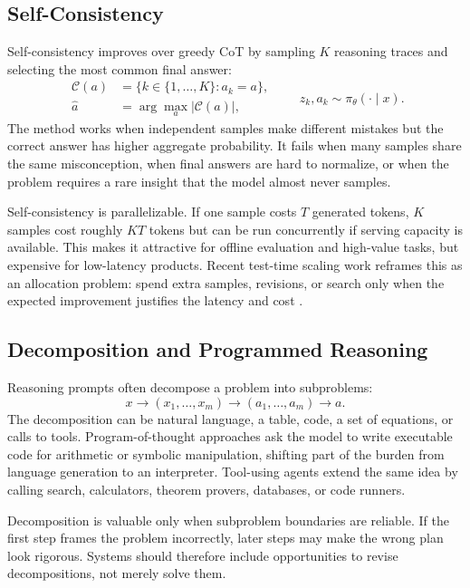 \subsection{Self-Consistency}
Self-consistency improves over greedy CoT by sampling $K$ reasoning traces and selecting the most common final answer:
\[
    \begin{aligned}
    \mathcal{C}(a) &= \{k\in\{1,\ldots,K\}: a_k=a\},\\
    \hat{a} &= \arg\max_a |\mathcal{C}(a)|,
    \end{aligned}
    \qquad
    z_k,a_k \sim \pi_\theta(\cdot\mid x).
\]
The method works when independent samples make different mistakes but the correct answer has higher aggregate probability. It fails when many samples share the same misconception, when final answers are hard to normalize, or when the problem requires a rare insight that the model almost never samples.

Self-consistency is parallelizable. If one sample costs $T$ generated tokens, $K$ samples cost roughly $K T$ tokens but can be run concurrently if serving capacity is available. This makes it attractive for offline evaluation and high-value tasks, but expensive for low-latency products. Recent test-time scaling work reframes this as an allocation problem: spend extra samples, revisions, or search only when the expected improvement justifies the latency and cost \cite{snell2024scaling,muennighoff2025s1}.

\subsection{Decomposition and Programmed Reasoning}
Reasoning prompts often decompose a problem into subproblems:
\[
    x \rightarrow (x_1,\ldots,x_m) \rightarrow (a_1,\ldots,a_m) \rightarrow a.
\]
The decomposition can be natural language, a table, code, a set of equations, or calls to tools. Program-of-thought approaches ask the model to write executable code for arithmetic or symbolic manipulation, shifting part of the burden from language generation to an interpreter. Tool-using agents extend the same idea by calling search, calculators, theorem provers, databases, or code runners.

Decomposition is valuable only when subproblem boundaries are reliable. If the first step frames the problem incorrectly, later steps may make the wrong plan look rigorous. Systems should therefore include opportunities to revise decompositions, not merely solve them.

